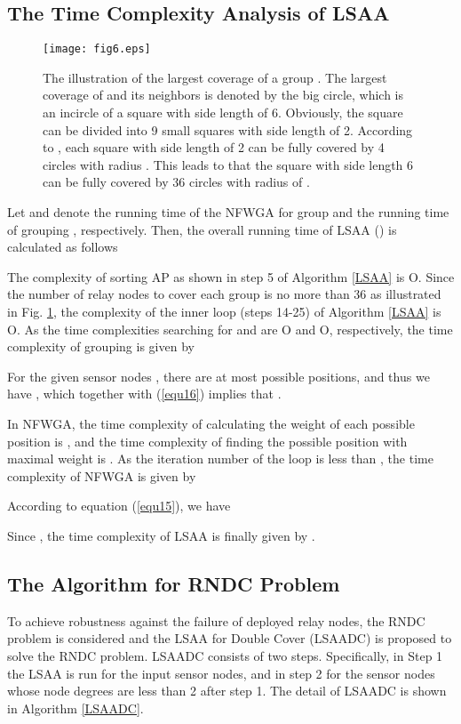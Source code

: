 \documentclass[journal]{IEEEtran}
\begin{document}
\subsection{The Time Complexity Analysis of LSAA}

\begin{figure}
\begin{center}
\texttt{[image: fig6.eps]}    \caption{The illustration of the largest coverage of a group . The largest coverage of  and its neighbors is denoted by the big circle, which is an incircle of a square with side length of 6. Obviously, the square can be divided into 9 small squares with side length of 2. According to \cite{Hochbaum85} \cite{Tang06}, each square with side length of 2 can be fully covered by 4 circles with radius . This leads to that the square with side length 6 can be fully covered by 36 circles with radius of .}
\label{fig6}                                 \end{center}                                 \end{figure}

Let  and   denote the running time of the NFWGA for group  and the running time of grouping , respectively. Then, the overall running time of LSAA () is calculated as follows


The complexity of sorting AP as shown in step 5 of Algorithm \ref{LSAA} is O. Since the number of relay nodes to cover each group is no more than 36 as illustrated in Fig. \ref{fig6}, the complexity of the inner loop (steps 14-25) of Algorithm \ref{LSAA} is O. As the time complexities searching for  and  are O and O, respectively, the time complexity of grouping  is given by


For the given sensor nodes , there are at most  possible positions, and thus we have , which together with (\ref{equ16}) implies that .

In NFWGA, the time complexity of calculating the weight of each possible position is , and the time complexity of finding the possible position with maximal weight is . As the iteration number of the loop is less than , the time complexity of NFWGA is given by


According to equation (\ref{equ15}), we have


Since , the time complexity of LSAA is finally given by .

\subsection{The Algorithm for RNDC Problem}
To achieve robustness against the failure of deployed relay nodes, the RNDC problem is considered and the LSAA for Double Cover (LSAADC) is proposed to solve the RNDC problem. LSAADC consists of two steps. Specifically, in Step 1 the LSAA is run for the input sensor nodes, and in step 2 for the sensor nodes whose node degrees are less than 2 after step 1. The detail of LSAADC is shown in Algorithm \ref{LSAADC}.
\end{document}
